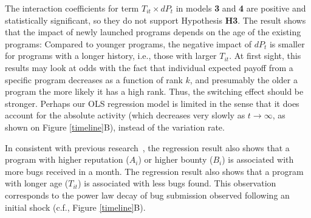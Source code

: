 The interaction coefficients for term $T_{it} \times dP_t$ in models {\bf 3} and {\bf 4} are positive and statistically significant, so they do not support Hypothesis {\bf H3}. The result shows that the impact of newly launched programs depends on the age of the existing programs: Compared to younger programs, the negative impact of $dP_t$ is smaller for programs with a longer history, i.e., those with larger $T_{it}$. At first sight, this results may look at odds with the fact that individual expected payoff from a specific program decreases as a function of rank $k$, and presumably the older a program the more likely it has a high rank. Thus, the switching effect should be stronger. Perhaps our OLS regression model is limited in the sense that it does account for the absolute activity (which decreases very slowly as $t \rightarrow \infty$, as shown on Figure \ref{timeline}B), instead of the variation rate.

In consistent with previous research~\cite{zhao2015empirical}, the regression result also shows that a program with higher reputation ($A_i$) or higher bounty ($B_i$) is associated with more bugs received in a month. The regression result also shows that a program with longer age ($T_{it}$) is associated with less bugs found. This observation corresponds to the power law decay of bug submission observed following an initial shock (c.f., Figure \ref{timeline}B).

